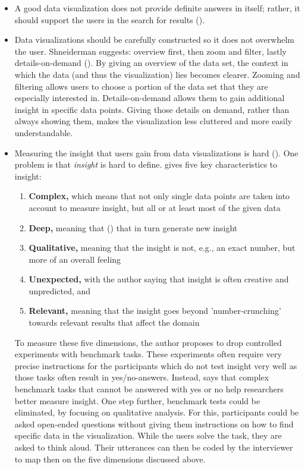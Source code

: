 \begin{itemize}
    \item A good data visualization does not provide definite answers in itself; rather, it should support the users in the search for results (\cite{light2001portable}).
    \item Data visualizations should be carefully constructed so it does not overwhelm the user. Shneiderman suggests: overview first, then zoom and filter, lastly details-on-demand (\cite{shneidermanEyesHaveIt1996}). By giving an overview of the data set, the context in which the data (and thus the visualization) lies becomes clearer. Zooming and filtering allows users to choose a portion of the data set that they are especially interested in. Details-on-demand allows them to gain additional insight in specific data points. Giving those details on demand, rather than always showing them, makes the visualization less cluttered and more easily understandable.
    \item Measuring the insight that users gain from data visualizations is hard (\cite{northMeasuringVisualizationInsight2006}). One problem is that \emph{insight} is hard to define. \citeauthor{northMeasuringVisualizationInsight2006} gives five key characteristics to insight:
    \begin{enumerate}
        \item \textbf{Complex,} which means that not only single data points are taken into account to measure insight, but all or at least most of the given data
        \item \textbf{Deep,} meaning that  (\cite[6]{northMeasuringVisualizationInsight2006}) that in turn generate new insight
        \item \textbf{Qualitative,} meaning that the insight is not, e.g., an exact number, but more of an overall feeling
        \item \textbf{Unexpected,} with the author saying that insight is often creative and unpredicted, and
        \item \textbf{Relevant,} meaning that the insight goes beyond 'number-crunching' towards relevant results that affect the domain
    \end{enumerate}
    To measure these five dimensions, the author proposes to drop controlled experiments with benchmark tasks. These experiments often require very precise instructions for the participants which do not test insight very well as those tasks often result in yes/no-answers. Instead, \citeauthor{northMeasuringVisualizationInsight2006} says that complex benchmark tasks that cannot be answered with yes or no help researchers better measure insight. One step further, benchmark tests could be eliminated, by focusing on qualitative analysis. For this, participants could be asked open-ended questions without giving them instructions on how to find specific data in the visualization. While the users solve the task, they are asked to think aloud. Their utterances can then be coded by the interviewer to map then on the five dimensions discussed above.
\end{itemize}
